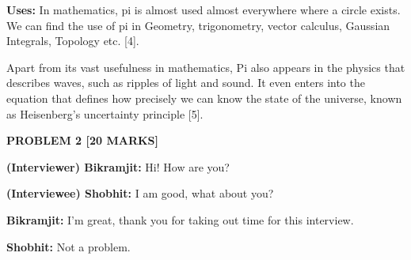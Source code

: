 \documentclass[12pt]{article}
\begin{document}
\begin{justify}
\textbf{Uses: }In mathematics, pi is almost used almost everywhere where a circle exists. We can find the use of pi in Geometry, trigonometry, vector calculus, Gaussian Integrals, Topology etc. [4].
\end{justify}\par

\begin{justify}
Apart from its vast usefulness in mathematics, Pi also appears in the physics that describes waves, such as ripples of light and sound. It even enters into the equation that defines how precisely we can know the state of the universe, known as Heisenberg's uncertainty principle [5].
\end{justify}\par


\vspace{\baselineskip}

\vspace{\baselineskip}

\vspace{\baselineskip}

\vspace{\baselineskip}

\vspace{\baselineskip}

\vspace{\baselineskip}

\vspace{\baselineskip}

\vspace{\baselineskip}

\vspace{\baselineskip}
\textbf{PROBLEM 2 [20 MARKS]}\par

\textbf{ (Interviewer) Bikramjit: }Hi! How are you?\par

\begin{justify}
\textbf{(Interviewee) Shobhit: }I am good, what about you?
\end{justify}\par

\begin{justify}
\textbf{Bikramjit: }I’m great, thank you for taking out time for this interview.
\end{justify}\par

\begin{justify}
\textbf{Shobhit: }Not a problem.
\end{justify}\par
\end{document}
